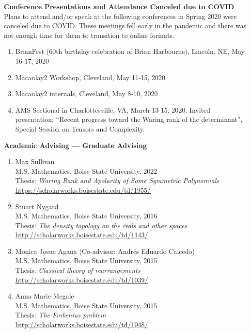 \documentclass[12pt]{article}
\begin{document}
\textbf{Conference Presentations and Attendance Canceled due to COVID} \\
Plans to attend and/or speak at the following conferences in Spring 2020 were canceled due to COVID.
These meetings fell early in the pandemic and there was not enough time for them to transition to online formats.
\begin{enumerate}[revarabic,labelwidth=*]
\item BrianFest (60th birthday celebration of Brian Harbourne), Lincoln, NE, May 16-17, 2020
\item Macaulay2 Workshop, Cleveland, May 11-15, 2020
\item Macaulay2 internals, Cleveland, May 8-10, 2020
\item AMS Sectional in Charlottesville, VA, March 13-15, 2020.
Invited presentation: ``Recent progress toward the Waring rank of the determinant'',
Special Session on Tensors and Complexity.
\end{enumerate}





\textbf{Academic Advising --- Graduate Advising}
\begin{enumerate}[revarabic,labelwidth=*]

\item Max Sullivan \\
M.S. Mathematics, Boise State University, 2022 \\
Thesis: \emph{Waring Rank and Apolarity of Some Symmetric Polynomials} \\
\url{https://scholarworks.boisestate.edu/td/1955/}

\item
Stuart Nygard \\
M.S. Mathematics, Boise State University, 2016 \\
Thesis: \emph{The density topology on the reals and other spaces} \\
\url{http://scholarworks.boisestate.edu/td/1143/}

\item Monica Josue Agana (Co-advisor: Andr\'es Eduardo Caicedo) \\
M.S. Mathematics, Boise State University, 2015 \\
Thesis: \emph{Classical theory of rearrangements} \\
\url{http://scholarworks.boisestate.edu/td/1039/}

\item Anna Marie Megale \\
M.S. Mathematics, Boise State University, 2015 \\
Thesis: \emph{The Frobenius problem} \\
\url{http://scholarworks.boisestate.edu/td/1048/}


\end{enumerate}
\end{document}
